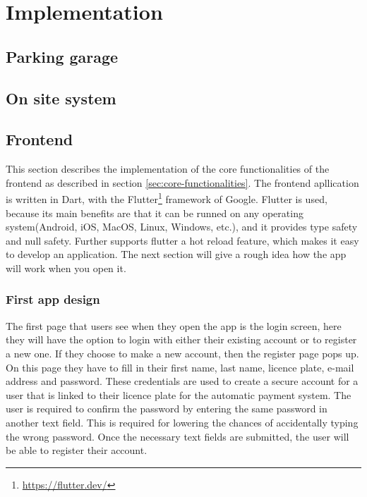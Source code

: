 \section{Implementation}\label{sec:implementation}

\subsection{Parking garage}\label{sec:implementation-parking-garage}

\subsection{On site system}\label{sec:implementation-on-site-system}



% 

\subsection{Frontend}\label{sec:implementation-frontend}
This section describes the implementation of the core functionalities of the frontend as described in section \ref{sec:core-functionalities}. The frontend apllication is written in Dart, with the Flutter\footnote{\url{https://flutter.dev/}} framework of Google. Flutter is used, because its main benefits are that it can be runned on any operating system(Android, iOS, MacOS, Linux, Windows, etc.), and it provides type safety and null safety. Further supports flutter a hot reload feature, which makes it easy to develop an application. The next section will give a rough idea how the app will work when you open it.

\subsubsection{First app design}
The first page that users see when they open the app is the login screen, here they will have the option to login with either their existing account or to register a new one. If they choose to make a new account, then the register page pops up. On this page they have to fill in their first name, last name, licence plate, e-mail address and password. These credentials are used to create a secure account for a user that is linked to their licence plate for the automatic payment system. The user is required to confirm the password by entering the same password in another text field. This is required for lowering the chances of accidentally typing the wrong password. Once the necessary text fields are submitted, the user will be able to register their account.

